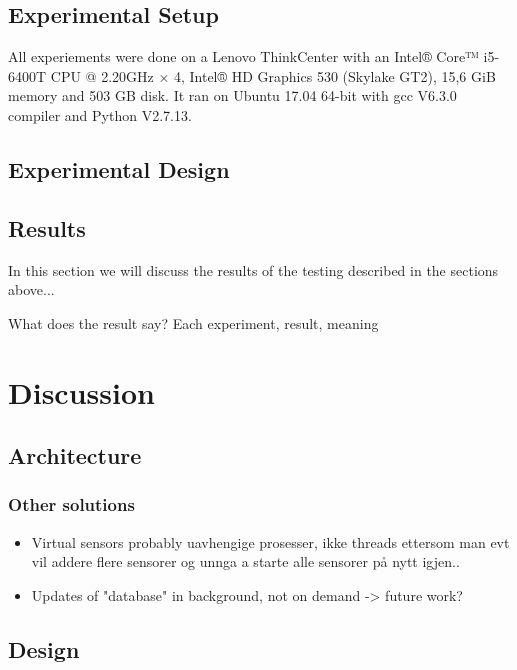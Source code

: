 \documentclass[USenglish]{uit-thesis}
\begin{document}
\section{Experimental Setup}
All experiements were done on a Lenovo ThinkCenter with an Intel® Core™ i5-6400T CPU @ 2.20GHz × 4, Intel® HD Graphics 530 (Skylake GT2), 15,6 GiB memory and 503 GB disk. It ran on Ubuntu 17.04 64-bit with gcc V6.3.0 compiler and Python V2.7.13.



\section{Experimental Design}
\section{Results}
In this section we will discuss the results of the testing described in the sections above...

What does the result say?
Each experiment, result, meaning


\chapter{Discussion}

\section{Architecture}
\subsection{Other solutions}
\begin{itemize}
\item Virtual sensors probably uavhengige prosesser, ikke threads ettersom man evt vil addere flere sensorer og unnga a starte alle sensorer på nytt igjen..
\item Updates of "database" in background, not on demand -> future work?
\end{itemize}

\section{Design}
\end{document}
